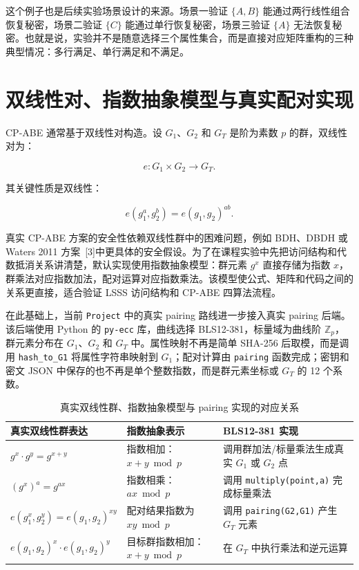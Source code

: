 这个例子也是后续实验场景设计的来源。场景一验证 $\{A,B\}$ 能通过两行线性组合恢复秘密，场景二验证 $\{C\}$ 能通过单行恢复秘密，场景三验证 $\{A\}$ 无法恢复秘密。也就是说，实验并不是随意选择三个属性集合，而是直接对应矩阵重构的三种典型情况：多行满足、单行满足和不满足。

\section{双线性对、指数抽象模型与真实配对实现}

CP-ABE 通常基于双线性对构造。设 $G_1$、$G_2$ 和 $G_T$ 是阶为素数 $p$ 的群，双线性对为：

\[
    e:G_1\times G_2\rightarrow G_T.
\]

其关键性质是双线性：

\[
    e(g_1^a,g_2^b)=e(g_1,g_2)^{ab}.
\]

真实 CP-ABE 方案的安全性依赖双线性群中的困难问题，例如 BDH、DBDH 或 Waters 2011 方案~[3]中更具体的安全假设。为了在课程实验中先把访问结构和代数抵消关系讲清楚，默认实现使用指数抽象模型：群元素 $g^x$ 直接存储为指数 $x$，群乘法对应指数加法，配对运算对应指数乘法。该模型使公式、矩阵和代码之间的关系更直接，适合验证 LSSS 访问结构和 CP-ABE 四算法流程。

在此基础上，当前 \verb|Project| 中的真实 pairing 路线进一步接入真实 pairing 后端。该后端使用 Python 的 \verb|py-ecc| 库，曲线选择 BLS12-381，标量域为曲线阶 $\mathbb{Z}_p$，群元素分布在 $G_1$、$G_2$ 和 $G_T$ 中。属性映射不再是简单 SHA-256 后取模，而是调用 \verb|hash_to_G1| 将属性字符串映射到 $G_1$；配对计算由 \verb|pairing| 函数完成；密钥和密文 JSON 中保存的也不再是单个整数指数，而是群元素坐标或 $G_T$ 的 12 个系数。

\begin{table}[H]
\centering
\caption{真实双线性群、指数抽象模型与 pairing 实现的对应关系}
\begin{tabular}{>{\raggedright\arraybackslash}p{} >{\raggedright\arraybackslash}p{} >{\raggedright\arraybackslash}p{}}
\toprule
真实双线性群表达 & 指数抽象表示 & BLS12-381 实现 \\
\midrule
$g^x\cdot g^y=g^{x+y}$ & 指数相加：$x+y \bmod p$ & 调用群加法/标量乘法生成真实 $G_1$ 或 $G_2$ 点 \\
$(g^x)^a=g^{ax}$ & 指数相乘：$a x \bmod p$ & 调用 \verb|multiply(point,a)| 完成标量乘法 \\
$e(g_1^x,g_2^y)=e(g_1,g_2)^{xy}$ & 配对结果指数为 $xy \bmod p$ & 调用 \verb|pairing(G2,G1)| 产生 $G_T$ 元素 \\
$e(g_1,g_2)^x\cdot e(g_1,g_2)^y$ & 目标群指数相加：$x+y \bmod p$ & 在 $G_T$ 中执行乘法和逆元运算 \\
\bottomrule
\end{tabular}
\end{table}

